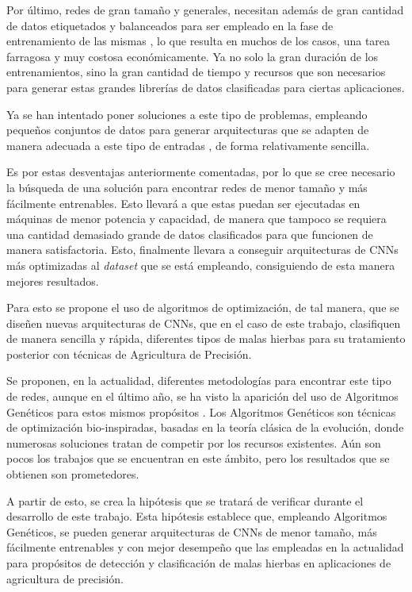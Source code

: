 Por último, redes de gran tamaño y generales, necesitan además de gran cantidad de datos etiquetados y balanceados para ser empleado en la fase de entrenamiento de las mismas \cite{Alzubaidi2021}, lo que resulta en muchos de los casos, una tarea farragosa y muy costosa económicamente. Ya no solo la gran duración de los entrenamientos, sino la gran cantidad de tiempo y recursos que son necesarios para generar estas grandes librerías de datos clasificadas para ciertas aplicaciones. 

Ya se han intentado poner soluciones a este tipo de problemas, empleando pequeños conjuntos de datos para generar arquitecturas que se adapten de manera adecuada a este tipo de entradas \cite{zoph2018learning}, de forma relativamente sencilla.

Es por estas desventajas anteriormente comentadas, por lo que se cree necesario la búsqueda de una solución para encontrar redes de menor tamaño y más fácilmente entrenables. Esto llevará a que estas puedan ser ejecutadas en máquinas de menor potencia y capacidad, de manera que tampoco se requiera una cantidad demasiado grande de datos clasificados para que funcionen de manera satisfactoria. Esto, finalmente llevara a conseguir arquitecturas de CNNs más optimizadas al \textit{dataset} que se está empleando, consiguiendo de esta manera mejores resultados.

Para esto se propone el uso de algoritmos de optimización, de tal manera, que se diseñen nuevas arquitecturas de CNNs, que en el caso de este trabajo, clasifiquen de manera sencilla y rápida, diferentes tipos de malas hierbas para su tratamiento posterior con técnicas de Agricultura de Precisión. 

Se proponen, en la actualidad, diferentes metodologías para encontrar este tipo de redes, aunque en el último año, se ha visto la aparición del uso de Algoritmos Genéticos para estos mismos propósitos \cite{Sun_2020}. Los Algoritmos Genéticos son técnicas de optimización bio-inspiradas, basadas en la teoría clásica de la evolución, donde numerosas soluciones tratan de competir por los recursos existentes. Aún son pocos los trabajos que se encuentran en este ámbito, pero los resultados que se obtienen son prometedores.

A partir de esto, se crea la hipótesis que se tratará de verificar durante el desarrollo de este trabajo. Esta hipótesis establece que, empleando Algoritmos Genéticos, se pueden generar arquitecturas de CNNs de menor tamaño, más fácilmente entrenables y con mejor desempeño que las empleadas en la actualidad para propósitos de detección y clasificación de malas hierbas en aplicaciones de agricultura de precisión.
